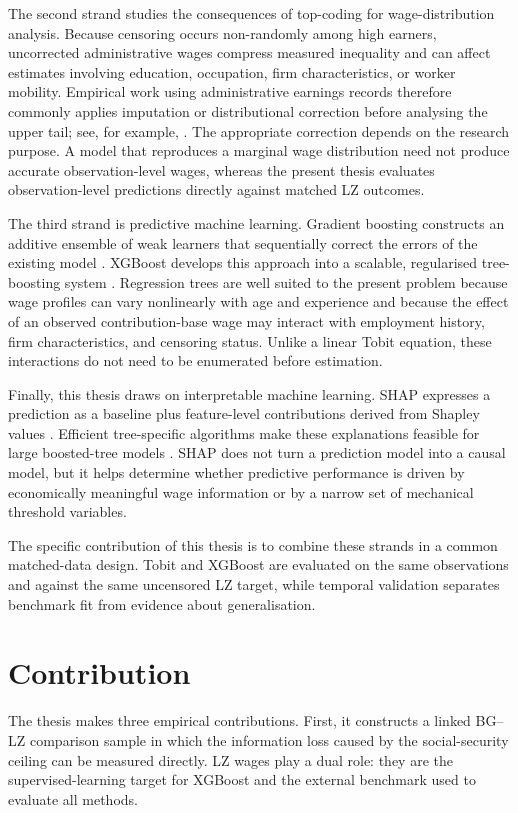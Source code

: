 \documentclass[12pt,a4paper,oneside,titlepage]{book}
\begin{document}
The second strand studies the consequences of top-coding for wage-distribution analysis. Because censoring occurs non-randomly among high earners, uncorrected administrative wages compress measured inequality and can affect estimates involving education, occupation, firm characteristics, or worker mobility. Empirical work using administrative earnings records therefore commonly applies imputation or distributional correction before analysing the upper tail; see, for example, \citet{dustmann2009}. The appropriate correction depends on the research purpose. A model that reproduces a marginal wage distribution need not produce accurate observation-level wages, whereas the present thesis evaluates observation-level predictions directly against matched LZ outcomes.

The third strand is predictive machine learning. Gradient boosting constructs an additive ensemble of weak learners that sequentially correct the errors of the existing model \citep{friedman2001}. XGBoost develops this approach into a scalable, regularised tree-boosting system \citep{chen2016}. Regression trees are well suited to the present problem because wage profiles can vary nonlinearly with age and experience and because the effect of an observed contribution-base wage may interact with employment history, firm characteristics, and censoring status. Unlike a linear Tobit equation, these interactions do not need to be enumerated before estimation.

Finally, this thesis draws on interpretable machine learning. SHAP expresses a prediction as a baseline plus feature-level contributions derived from Shapley values \citep{shapley1953,lundberg2017}. Efficient tree-specific algorithms make these explanations feasible for large boosted-tree models \citep{lundberg2020}. SHAP does not turn a prediction model into a causal model, but it helps determine whether predictive performance is driven by economically meaningful wage information or by a narrow set of mechanical threshold variables.

The specific contribution of this thesis is to combine these strands in a common matched-data design. Tobit and XGBoost are evaluated on the same observations and against the same uncensored LZ target, while temporal validation separates benchmark fit from evidence about generalisation.

\section{Contribution}
The thesis makes three empirical contributions. First, it constructs a linked BG--LZ comparison sample in which the information loss caused by the social-security ceiling can be measured directly. LZ wages play a dual role: they are the supervised-learning target for XGBoost and the external benchmark used to evaluate all methods.
\end{document}
